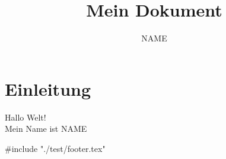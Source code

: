 \documentclass{article}
\title{Mein Dokument}
\author{NAME}
\begin{document}
\maketitle
\section{Einleitung}
Hallo Welt! \\
Mein Name ist NAME

#include "./test/footer.tex"

\end{document}

